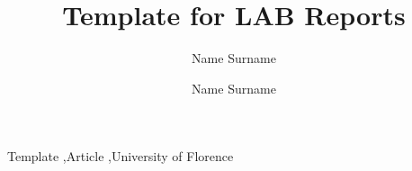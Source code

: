 \begin{frontmatter}

    \title{Template for LAB Reports}


    \author[inst1]{Name Surname}
    
    \author[inst1]{Name Surname}

    \begin{abstract}
        \lipsum[1]
    \end{abstract}
    
    \begin{keyword}
        Template \sep Article \sep University of Florence   
    \end{keyword}

\end{frontmatter}

